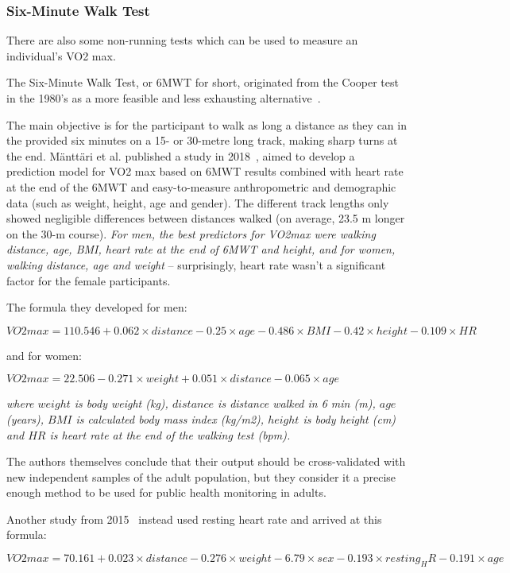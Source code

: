 \subsubsection*{Six-Minute Walk Test}

There are also some non-running tests which can be used to measure an individual's VO2 max.

The Six-Minute Walk Test, or 6MWT for short, originated from the Cooper test in the 1980's as a more feasible and less exhausting alternative~\cite{6mwt-history}.

The main objective is for the participant to walk as long a distance as they can in the provided six minutes on a 15- or 30-metre long track, making sharp turns at the end.
Mänttäri et al. published a study in 2018~\cite{6min-walk-test-mantarri}, aimed to develop a prediction model for VO2 max based on 6MWT results combined with heart rate at the end of the 6MWT and easy-to-measure anthropometric and demographic data (such as weight, height, age and gender).
The different track lengths only showed negligible differences between distances walked (on average, 23.5 m longer on the 30-m course).
\textit{For men, the best predictors for VO2max were walking distance, age, BMI, heart rate at the end of 6MWT and height, and for women, walking distance, age and weight} -- surprisingly, heart rate wasn't a significant factor for the female participants.

The formula they developed for men:

 $VO2 max=110.546 + 0.062\times distance - 0.25\times age - 0.486\times BMI - 0.42\times height - 0.109\times HR$

 and for women:

 $VO2 max=22.506 - 0.271\times weight + 0.051\times distance - 0.065\times age$

 \textit{where $weight$ is body weight (kg), $distance$ is distance walked in 6 min (m), $age$ (years), $BMI$ is calculated body mass index (kg/m2), $height$ is body height (cm) and $HR$ is heart rate at the end of the walking test (bpm).}

The authors themselves conclude that their output should be cross-validated with new independent samples of the adult population,
but they consider it a precise enough method to be used for public health monitoring in adults.

Another study from 2015~\cite{6min-walk-test-burr} instead used resting heart rate and arrived at this formula:

$VO2 max =70.161 + 0.023 \times distance - 0.276 \times weight - 6.79 \times sex - 0.193 \times resting_HR - 0.191 \times age$

